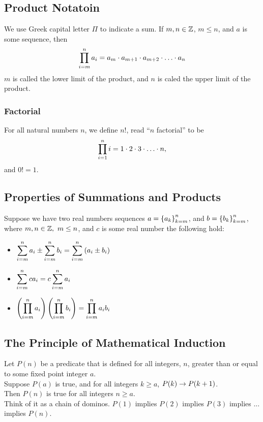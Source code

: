 \documentclass{report}
\begin{document}
\subsection*{Product Notatoin}
We use Greek capital letter $\Pi$ to indicate a sum. If $m,n\in\mathbb{Z}$, $m\leq n$, and $a$ is some sequence, then
$$
	\prod_{i=m}^{n} a_i = a_m \cd a_{m+1} \cd a_{m+2} \cd \dots \cd a_n
$$
$m$ is called the lower limit of the product, and $n$ is caled the upper limit of the product. \\

\subsubsection*{Factorial}
For all natural numbers $n$, we define $n!$, read ``$n$ factorial'' to be
$$
	\prod_{i=1}^{n} i = 1 \cd 2 \cd 3 \cd \dots \cd n,
$$
and $0! = 1$.

\subsection*{Properties of Summations and Products}
Suppose we have two real numbers sequences $a=\left\lbrace a_k \right\rbrace_{k=m}^{n}$, and $b=\left\lbrace b_k \right\rbrace_{k=m}^{n}$, where $m,n\in\mathbb{Z},\ m\leq n$, and $c$ is some real number the following hold:
\begin{itemize}
	\item $\displaystyle{\sum_{i=m}^{n} a_i \pm \sum_{i=m}^{n} b_i =  \sum_{i=m}^{n} \left(a_i \pm b_i \right)}$
	\item $\displaystyle{\sum_{i=m}^{n} c a_i = c \sum_{i=m}^{n} a_i}$
	\item $\displaystyle{\left(\prod_{i=m}^{n} a_i \right)\left(\prod_{i=m}^{n} b_i \right)= \prod_{i=m}^{n} a_ib_i}$
\end{itemize}

\subsection*{The Principle of Mathematical Induction}
Let $P(n)$ be a predicate that is defined for all integers, $n$, greater than or equal to some fixed point integer $a$. \\

Suppose $P(a)$ is true, and for all integers $k\geq a$, $P(k)\rightarrow P(k+1)$. \\
Then $P(n)$ is true for all integers $n\geq a$. \\

Think of it as a chain of dominos. $P(1)$ implies $P(2)$ implies $P(3)$ implies ... implies $P(n)$. \\
\end{document}
